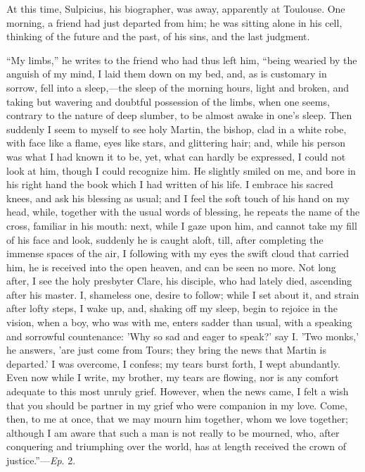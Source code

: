 At this time, Sulpicius, his biographer, was away, apparently at
Toulouse. One morning, a friend had just departed from him; he was
sitting alone in his cell, thinking of the future and the past, of his
sins, and the last judgment.

``My limbs,'' he writes to the friend who had thus left
him, ``being wearied by the anguish of my mind, I laid them down
on my bed, and, as is customary in sorrow, fell into a sleep,—the
sleep of the morning hours, light and broken, and taking but wavering
and doubtful possession of the limbs, when one seems, contrary to the
nature of deep slumber, to be almost awake in one's sleep.
Then suddenly I seem to myself to see holy
Martin, the bishop, clad in a white robe, with face like a flame, eyes
like stars, and glittering hair; and, while his person was what I had
known it to be, yet, what can hardly be expressed, I could not look at
him, though I could recognize him. He slightly smiled on me, and bore
in his right hand the book which I had written of his life. I embrace
his sacred knees, and ask his blessing as usual; and I feel the soft
touch of his hand on my head, while, together with the usual words of
blessing, he repeats the name of the cross, familiar in his mouth:
next, while I gaze upon him, and cannot take my fill of his face and
look, suddenly he is caught aloft, till, after completing the immense
spaces of the air, I following with my eyes the swift cloud that
carried him, he is received into the open heaven, and can be seen no
more. Not long after, I see the holy presbyter Clare, his disciple,
who had lately died, ascending after his master. I, shameless one,
desire to follow; while I set about it, and strain after lofty steps,
I wake up, and, shaking off my sleep, begin to rejoice in the vision,
when a boy, who was with me, enters sadder than usual, with a speaking
and sorrowful countenance: 'Why so sad and eager to speak?' say I.
'Two monks,' he answers, 'are just come from Tours; they bring the
news that Martin is departed.' I was overcome, I confess; my tears
burst forth, I wept abundantly. Even now while I write, my brother, my
tears are flowing, nor is any comfort adequate to this most unruly
grief. However, when the news came, I felt a wish that you should be
partner in my grief who were companion in my love. Come, then, to me
at once, that we may mourn him together, whom we love together;
although I am aware that such a man is not really to be mourned, who,
after conquering and triumphing over the world, has at length received
the crown of justice.''—\emph{Ep}. 2.

